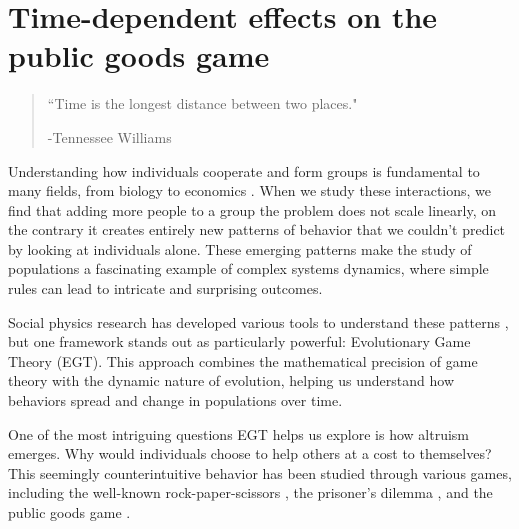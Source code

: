 \chapter{Time-dependent effects on the public goods game} %
\label{chap:TimeEffects}



\begin{quotation}

	\vspace{-3cm}

    \begin{flushright}
    \begin{minipage}[t][5cm][b]{0.5\textwidth}
    { ``Time is the longest distance between two places."}
    
    \bigskip
    
    -{\small  Tennessee Williams}
    \end{minipage}
    \end{flushright}
    
    \vspace{0.5cm}
\end{quotation}




Understanding how individuals cooperate and form groups is fundamental to many fields, from biology to economics \cite{CoopBio,CoopEconomy}. When we study these interactions, we find that adding more people to a group the problem does not scale linearly, on the contrary it creates entirely new patterns of behavior that we couldn't predict by looking at individuals alone. These emerging patterns make the study of populations a fascinating example of complex systems dynamics, where simple rules can lead to intricate and surprising outcomes.

Social physics research has developed various tools to understand these patterns \cite{SocialPhy}, but one framework stands out as particularly powerful: Evolutionary Game Theory (EGT). This approach combines the mathematical precision of game theory with the dynamic nature of evolution, helping us understand how behaviors spread and change in populations over time.

One of the most intriguing questions EGT helps us explore is how altruism emerges. Why would individuals choose to help others at a cost to themselves? This seemingly counterintuitive behavior has been studied through various games, including the well-known rock-paper-scissors \cite{RPSCooperation}, the prisoner's dilemma \cite{Prisionero}, and the public goods game \cite{PublicGoods}.

